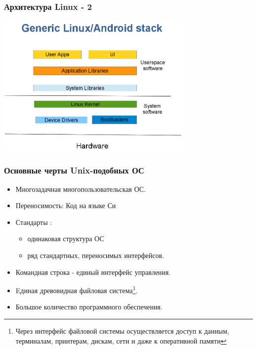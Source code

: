 \begin{frame}
  \frametitle{Архитектура Linux - 2}

  \begin{center}
    \includegraphics[height=7cm]{clipart/linux-software-stack}
  \end{center}
\end{frame}

\begin{frame}
  \frametitle{Основные черты Unix-подобных ОС}

  \begin{itemize}
    \item Многозадачная многопользовательская ОС.
    \item Переносимость: Код на языке Си
    \item Стандарты :
      \begin{itemize} 
	\item одинаковая структура ОС
	\item ряд стандартных, переносимых интерфейсов.
      \end{itemize}
    \item Командная строка - единый интерфейс управления.
    \item Eдиная древовидная файловая система\footnote{Через интерфейс файловой системы осуществляется доступ к данным, терминалам, принтерам, дискам, сети и даже к оперативной памяти}.
    \item Большое количество программного обеспечения.
  \end{itemize}
\end{frame}





